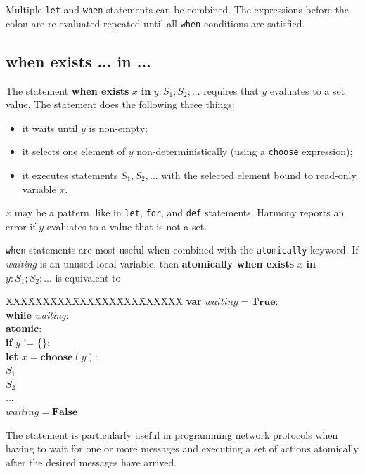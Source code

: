\documentclass{report}
\newenvironment{code}{
\tcolorbox
}{
\endtcolorbox
}
\begin{document}
Multiple \texttt{let} and \texttt{when} statements can be combined.
The expressions before the colon are re-evaluated repeated until all
\texttt{when} conditions are satisfied.

\subsection*{\textbf{when exists ... in ...}}

The statement \textbf{when exists} $x$ \textbf{in} $y: S_1; S_2; ...$
requires that $y$ evaluates to a set value.
The statement does the following three things:
\begin{itemize}
\item it waits until $y$ is non-empty;
\item it selects one element of $y$ non-deterministically (using
a \texttt{choose} expression);
\item it executes statements $S_1, S_2, ...$ with the selected element
bound to read-only variable $x$.
\end{itemize}
$x$ may be a pattern, like in \texttt{let}, \texttt{for}, and \texttt{def}
statements.
Harmony reports an error if $y$ evaluates to a value that is not a set.

\texttt{when} statements are most useful when combined with the
\texttt{atomically} keyword.
If \textit{waiting} is an unused local variable,
then \textbf{atomically when exists} $x$ \textbf{in} $y: S_1; S_2; ...$ is equivalent to

\begin{code}
\begin{tabbing}
XXX\=XXX\=XXX\=XXX\=XXX\=XXX\=XXX\=XXX\kill
\>\textbf{var} $\mathit{waiting} = \mathbf{True}:$ \\
\>\textbf{while} \textit{waiting}: \\
\>\>\textbf{atomic}: \\
\>\>\>\textbf{if} $y$ != \{\}:\\
\>\>\>\>\textbf{let} $x = \mathbf{choose}(y)$:\\
\>\>\>\>\>$S_1$ \\
\>\>\>\>\>$S_2$ \\
\>\>\>\>\>$...$ \\
\>\>\>\>$\mathit{waiting} = \mathbf{False}$
\end{tabbing}
\end{code}

The statement is particularly useful in programming network protocols
when having to wait for one or more messages and executing a set
of actions atomically after the desired messages have arrived.
\end{document}
